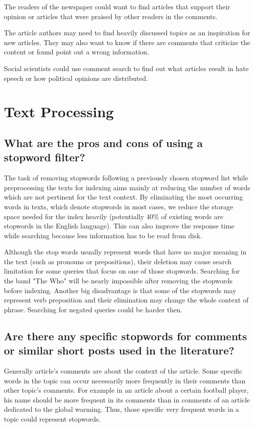 \documentclass{scrartcl}
\begin{document}
The readers of the newspaper could want to find articles that support their opinion or articles that were praised by other readers in the comments.

The article authors may need to find heavily discussed topics as an inspiration for new articles. They may also want to know if there are comments that criticize the content or found point out a wrong information.

Social scientists could use comment search to find out what articles result in hate speech or how political opinions are distributed.


\section{Text Processing}

\subsection{What are the pros and cons of using a stopword filter? }

The task  of removing stopwords following a previously chosen stopword list while preprocessing the texts for indexing aims mainly at reducing the number of words which are not pertinent for the text context. By eliminating the most occurring words in texts, which denote stopwords in most cases, we reduce the storage space needed for the index heavily (potentially 40\% of existing words are stopwords in the English language). This can also improve the response time while searching because less information has to be read from disk.

Although the stop words usually represent words that have no major meaning in the text (such as pronouns or prepositions), their deletion may cause search limitation for some queries that focus on one of those stopwords. Searching for the band "The Who" will be nearly impossible after removing the stopwords before indexing. Another big disadvantage is that some of the stopwords may represent verb preposition and their elimination may change the whole context of phrase. Searching for negated queries could be harder then.

\subsection{Are there any specific stopwords for comments or similar short posts used in the literature?}

Generally article's comments are about the context of the article. Some specific words in the topic can occur necessarily more frequently in their comments than other topic's comments. For example in an article about a certain football player, his name should be more frequent in its comments than in comments of an article dedicated to the global warming. Thus, those specific very frequent words in a topic could represent stopwords.
\end{document}
